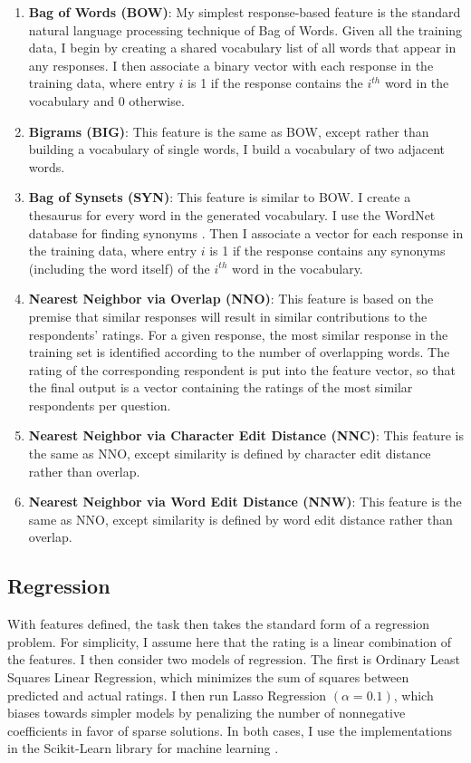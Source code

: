 \begin{enumerate}

\item \textbf{Bag of Words (BOW)}: My simplest response-based feature is the standard natural language processing technique of Bag of Words. Given all the training data, I begin by creating a shared vocabulary list of all words that appear in any responses. I then associate a binary vector with each response in the training data, where entry $i$ is 1 if the response contains the $i^{th}$ word in the vocabulary and 0 otherwise.

\item \textbf{Bigrams (BIG)}: This feature is the same as BOW, except rather than building a vocabulary of single words, I build a vocabulary of two adjacent words.

\item \textbf{Bag of Synsets (SYN)}: This feature is similar to BOW. I create a thesaurus for every word in the generated vocabulary. I use the WordNet database for finding synonyms  \citep{fellbaum1998wordnet}. Then I associate a vector for each response in the training data, where entry $i$ is 1 if the response contains any synonyms (including the word itself) of the $i^{th}$ word in the vocabulary.

\item \textbf{Nearest Neighbor via Overlap (NNO)}: This feature is based on the premise that similar responses will result in similar contributions to the respondents' ratings. For a given response, the most similar response in the training set is identified according to the number of overlapping words. The rating of the corresponding respondent is put into the feature vector, so that the final output is a vector containing the ratings of the most similar respondents per question.

\item \textbf{Nearest Neighbor via Character Edit Distance (NNC)}: This feature is the same as NNO, except similarity is defined by character edit distance rather than overlap.

\item \textbf{Nearest Neighbor via Word Edit Distance (NNW)}: This feature is the same as NNO, except similarity is defined by word edit distance rather than overlap.


\end{enumerate}

\subsection{Regression}
With features defined, the task then takes the standard form of a regression problem. For simplicity, I assume here that the rating is a linear combination of the features. I then consider two models of regression. The first is Ordinary Least Squares Linear Regression, which minimizes the sum of squares between predicted and actual ratings. I then run Lasso Regression $(\alpha = 0.1)$, which biases towards simpler models by penalizing the number of nonnegative coefficients in favor of sparse solutions. In both cases, I use the implementations in the Scikit-Learn library for machine learning  \citep{pedregosa2011scikit}.
